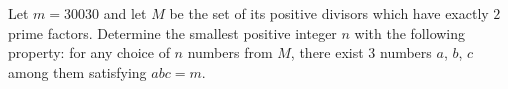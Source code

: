 Let $m = 30030$ and let $M$ be the set of its positive divisors which have exactly $2$ prime factors. Determine the smallest positive integer $n$ with the following property: for any choice of $n$ numbers from $M$,  there exist 3 numbers $a$,  $b$,  $c$ among them satisfying $abc=m$.